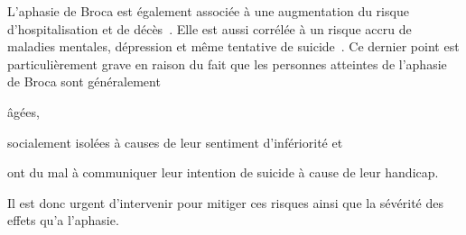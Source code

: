L'aphasie de Broca est également associée à une augmentation du risque d'hospitalisation 
et de décès~\cite{Flowers_Skoretz_Silver_Rochon_Fang_Flamand-Roze_Martino_2016}.
Elle est aussi corrélée à un risque accru de maladies mentales, 
dépression et même tentative de suicide~\cite{Morrison_2016,Costanza_et_al._2021}.
Ce dernier point est particulièrement grave en raison du fait que 
les personnes atteintes de l'aphasie de Broca sont généralement
\begin{enumerate*}[label=(\arabic*)]
    \item âgées, 
    \item socialement isolées à causes de leur sentiment d'infériorité et 
    \item ont du mal à communiquer leur intention de suicide à cause de leur handicap.
\end{enumerate*}
Il est donc urgent d'intervenir pour mitiger ces risques ainsi que la sévérité des effets qu'a l'aphasie.